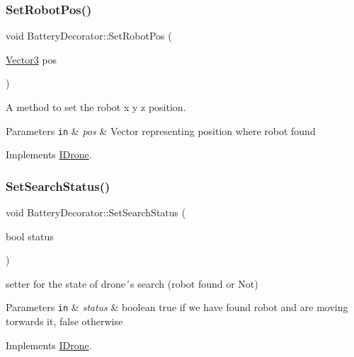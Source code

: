 \subsubsection{\texorpdfstring{Set\+Robot\+Pos()}{SetRobotPos()}}
{\footnotesize\ttfamily void Battery\+Decorator\+::\+Set\+Robot\+Pos (\begin{DoxyParamCaption}\item[{\hyperlink{classVector3}{Vector3}}]{pos }\end{DoxyParamCaption})\hspace{0.3cm}{\ttfamily [virtual]}}



A method to set the robot x y z position. 


\begin{DoxyParams}[1]{Parameters}
\mbox{\tt in}  & {\em pos} & Vector representing position where robot found \\
\hline
\end{DoxyParams}


Implements \hyperlink{classIDrone_a5851e679bf3c915e93165377cb5c8815}{I\+Drone}.

\mbox{\label{classBatteryDecorator_a41d8c8512cf82484120a9f3f951c4c2b}} 
\subsubsection{\texorpdfstring{Set\+Search\+Status()}{SetSearchStatus()}}
{\footnotesize\ttfamily void Battery\+Decorator\+::\+Set\+Search\+Status (\begin{DoxyParamCaption}\item[{bool}]{status }\end{DoxyParamCaption})\hspace{0.3cm}{\ttfamily [virtual]}}



setter for the state of drone´s search (robot found or Not) 


\begin{DoxyParams}[1]{Parameters}
\mbox{\tt in}  & {\em status} & boolean true if we have found robot and are moving torwards it, false otherwise \\
\hline
\end{DoxyParams}


Implements \hyperlink{classIDrone_ac6f580814e7091ea64ecf2a7137b8120}{I\+Drone}.

